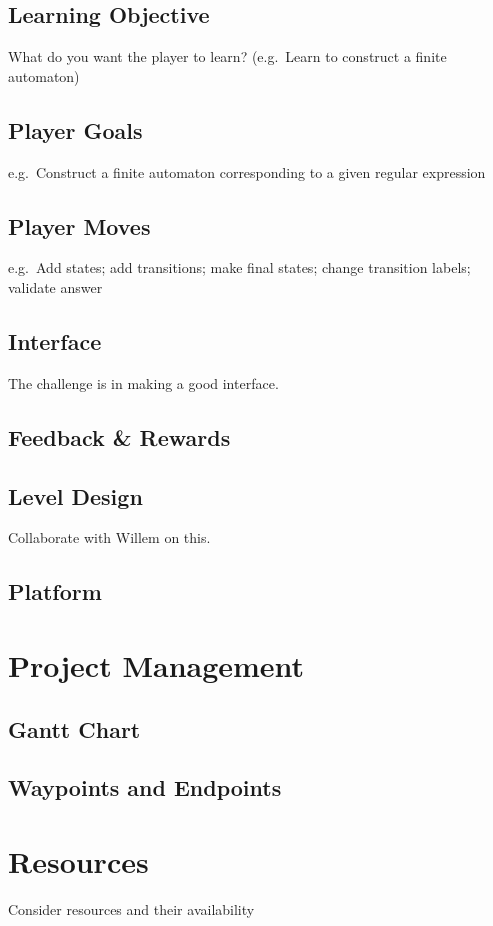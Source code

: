\documentclass[a4paper]{article}
\begin{document}
\subsection{Learning Objective}
What do you want the player to learn? (e.g.\ Learn to construct a finite automaton)

\subsection{Player Goals}
e.g.\ Construct a finite automaton corresponding to a given regular expression

\subsection{Player Moves}
e.g.\ Add states; add transitions; make final states; change transition labels; validate answer

\subsection{Interface}
The challenge is in making a good interface.

\subsection{Feedback \& Rewards}

\subsection{Level Design}
Collaborate with Willem on this.

\subsection{Platform}


\section{Project Management} %
\subsection{Gantt Chart}
\subsection{Waypoints and Endpoints}

\section{Resources} %
Consider resources and their availability

\newpage
\printbibliography
\end{document}
